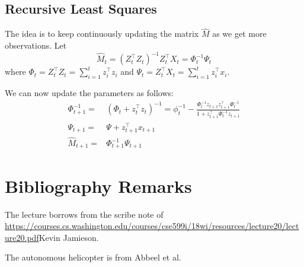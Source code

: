 \subsection{Recursive Least Squares}

The idea is to keep continuously updating the matrix $\hat{M}$ as we
get more observations. Let
\[
\hat{M}_t = (Z_t^\top Z_t)^{-1}Z_t^\top X_t=\Phi_t^{-1}\Psi_t
\]
where $\Phi_t=Z_t^\top Z_t=\sum_{i=1}^t z_i^\top z_i$ and
$\Psi_t=Z_t^\top X_t=\sum_{i=1}^t z_i^\top x_i$.

We can now update the parameters as follows:
\begin{align*}
\Phi_{t+1}^{-1}=&(\Phi_t+z_t^\top z_t)^{-1} =
\phi_t^{-1}-\frac{\Phi_t^{-1}z_{t+1}z_{t+1}^\top\Phi_t^{-1}}{1+z_{t+1}^\top\Phi_t^{-1}z_{t+1}}\\
\Psi_{t+1}=&\Psi+z_{t+1}^\top x_{t+1}\\
\hat{M}_{t+1}=&\Phi_{t+1}^{-1}\Psi_{t+1}
\end{align*}



\section{Bibliography Remarks}

The lecture borrows from the scribe note of
\url{https://courses.cs.washington.edu/courses/cse599i/18wi/resources/lecture20/lecture20.pdf}{Kevin
Jamieson}.


The autonomous helicopter is from Abbeel et al. \cite{AbbeelCN2010}

%
%
